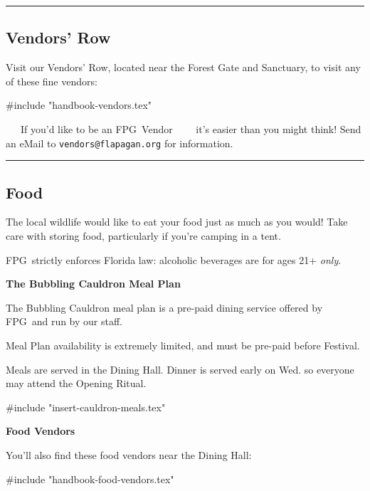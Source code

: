 \documentclass[9pt,twoside,openright,final,article]{memoir}
\def\fpg{{\beltanefamily FPG\ }}
\let\oldsection=\section
\renewcommand{\section}[1]{%
  \vspace{3pt}%
  \needspace{1in}%
  { \hrule } \nopagebreak %
  \begin{center}\oldsection{#1}\end{center}\nopagebreak{}}
\renewcommand{\subsection}[1]{%
  \vspace{6pt}%
  \needspace{1.25in}%
  \begin{center}\textbf{\Large \beltanefamily #1}\end{center}

  \nopagebreak}
\renewcommand{\subsubsection}[1]{%
  \vspace{1pt}\needspace{1.5in}
  {\large ~~~\beltanefamily #1~~~\ }
  \nopagebreak}
\begin{document}
\section{Vendors' Row}

\begin{multicols}{2}


  Visit our Vendors' Row, located near the Forest Gate and Sanctuary,
  to visit any of these fine vendors:

  #include "handbook-vendors.tex"


  \subsubsection{If you'd like to be an \fpg Vendor} it's easier than
  you might think! Send an eMail to \texttt{vendors@flapagan.org} for
  information.

  \section{Food}

  The local wildlife would like to eat your food just as much as you
  would! Take care with storing food, particularly if you're camping
  in a tent.

  \fpg strictly enforces Florida law: alcoholic beverages are for ages
  21+ \emph{only}.

  \subsection{The Bubbling Cauldron Meal Plan}

  The Bubbling Cauldron meal plan is a pre-paid dining service offered
  by \fpg and run by our staff.

  {\small Meal Plan availability is extremely limited, and must be
    pre-paid before Festival.}

  Meals are served in the Dining Hall. {\small Dinner is served early
    on Wed. so everyone may attend the Opening Ritual.}


  #include "insert-cauldron-meals.tex"

  \subsection{Food Vendors}

  You'll also find these food vendors near the Dining Hall:

  #include "handbook-food-vendors.tex"


\end{multicols}
\end{document}

